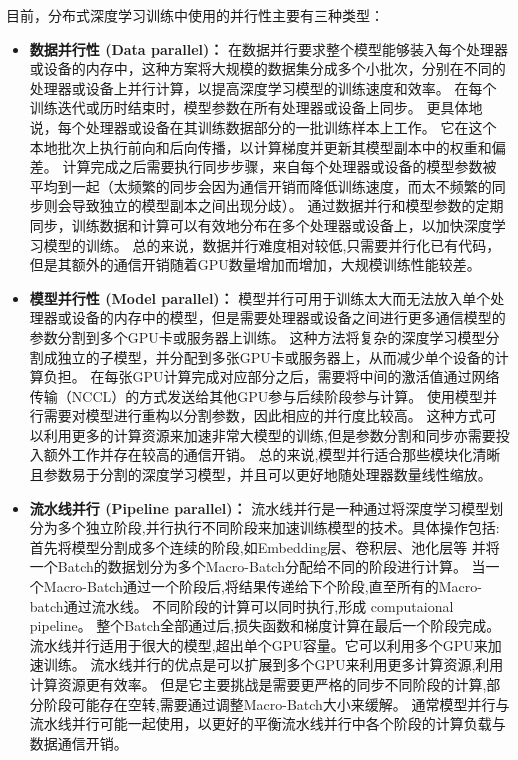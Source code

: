 目前，分布式深度学习训练中使用的并行性主要有三种类型：

\begin{itemize}
\item 
\textbf{数据并行性 (Data parallel)：}
在数据并行要求整个模型能够装入每个处理器或设备的内存中，这种方案将大规模的数据集分成多个小批次，分别在不同的处理器或设备上并行计算，以提高深度学习模型的训练速度和效率。
% 
在每个训练迭代或历时结束时，模型参数在所有处理器或设备上同步。
% 
更具体地说，每个处理器或设备在其训练数据部分的一批训练样本上工作。
% 
它在这个本地批次上执行前向和后向传播，以计算梯度并更新其模型副本中的权重和偏差。
% 
计算完成之后需要执行同步步骤，来自每个处理器或设备的模型参数被平均到一起（太频繁的同步会因为通信开销而降低训练速度，而太不频繁的同步则会导致独立的模型副本之间出现分歧）。
% 
通过数据并行和模型参数的定期同步，训练数据和计算可以有效地分布在多个处理器或设备上，以加快深度学习模型的训练。
% 
总的来说，数据并行难度相对较低,只需要并行化已有代码，但是其额外的通信开销随着GPU数量增加而增加，大规模训练性能较差。


\item
\textbf{模型并行性 (Model parallel)：}
模型并行可用于训练太大而无法放入单个处理器或设备的内存中的模型，但是需要处理器或设备之间进行更多通信模型的参数分割到多个GPU卡或服务器上训练。
% 
这种方法将复杂的深度学习模型分割成独立的子模型，并分配到多张GPU卡或服务器上，从而减少单个设备的计算负担。
% 
在每张GPU计算完成对应部分之后，需要将中间的激活值通过网络传输（NCCL）的方式发送给其他GPU参与后续阶段参与计算。
% 
使用模型并行需要对模型进行重构以分割参数，因此相应的并行度比较高。
% 
这种方式可以利用更多的计算资源来加速非常大模型的训练,但是参数分割和同步亦需要投入额外工作并存在较高的通信开销。
% 
总的来说,模型并行适合那些模块化清晰且参数易于分割的深度学习模型，并且可以更好地随处理器数量线性缩放。


\item
\textbf{流水线并行 (Pipeline parallel)：}
流水线并行是一种通过将深度学习模型划分为多个独立阶段,并行执行不同阶段来加速训练模型的技术。具体操作包括:
% 
首先将模型分割成多个连续的阶段,如Embedding层、卷积层、池化层等
% 
并将一个Batch的数据划分为多个Macro-Batch分配给不同的阶段进行计算。
% 
当一个Macro-Batch通过一个阶段后,将结果传递给下个阶段,直至所有的Macro-batch通过流水线。
% 
不同阶段的计算可以同时执行,形成 computaional pipeline。
% 
整个Batch全部通过后,损失函数和梯度计算在最后一个阶段完成。
% 
流水线并行适用于很大的模型,超出单个GPU容量。它可以利用多个GPU来加速训练。
% 
流水线并行的优点是可以扩展到多个GPU来利用更多计算资源,利用计算资源更有效率。
% 
但是它主要挑战是需要更严格的同步不同阶段的计算,部分阶段可能存在空转,需要通过调整Macro-Batch大小来缓解。
% 
通常模型并行与流水线并行可能一起使用，以更好的平衡流水线并行中各个阶段的计算负载与数据通信开销。

\end{itemize}

